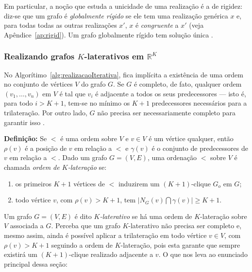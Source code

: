 Em particular, a noção que estuda a unicidade de uma realização é a de rigidez: diz-se que um grafo é \textit{globalmente rígido} se ele tem uma realização genérica $x$ e, para todas todas as outras realizações $x'$, $x$ é \textit{congruente} a $x'$ (veja Apêndice~\ref{ap:rigid}). Um grafo globalmente rígido tem solução única \cite{carlileGDandAplications, rigidezGrafosEAplicacoesAnaCarlile}.

\subsubsection{Realizando grafos $K$-laterativos em $\mathbb{R}^K$ \label{sec:oi}}

No Algorítimo~\ref{alg:realizacaoIterativa}, fica implícita a existência de uma ordem no conjunto de vértices $V$ do grafo $G$. Se $G$ é completo, de fato, qualquer ordem $(v_1,\dots,v_n)$ em $V$ é tal que $v_i$ é adjacente a todos os seus predecessores --- isto é, para todo $i>K+1$, tem-se no mínimo os $K+1$ predecessores necessários para a trilateração. Por outro lado, $G$ não precisa ser necessariamente completo para garantir isso \cite{libertiEDG}.

\begin{center}
	\begin{minipage}{0.93 \linewidth}
		\textbf{Definição:} Se $<$ é uma ordem sobre $V$ e $v\in V$ é um vértice qualquer, então $\rho(v)$ é a posição de $v$ em relação a $<$ e $\gamma(v)$ é o conjunto de predecessores de $v$ em relação a $<$. Dado um grafo $G=(V,E)$, uma ordenação $<$ sobre $V$ é chamada \textit{ordem de $K$-lateração} se:
		\begin{enumerate}
			\vspace{-0.2cm}
			\item os primeiros $K+1$ vértices de $<$ induzirem um $(K+1)$-clique $G_o$ em $G$;
			\vspace{-0.2cm}
			\item todo vértice $v$, com $\rho(v) > K+1$, tem $\lvert N_G(v) \bigcap \gamma(v)\rvert \geq K+1$.
		\end{enumerate}
	\end{minipage}
\end{center}

Um grafo $G = (V,E)$ é dito \textit{$K$-laterativo} se há uma ordem de $K$-lateração sobre $V$ associada a $G$. Perceba que um grafo $K$-laterativo não precisa ser completo e, mesmo assim, ainda é possível aplicar a trilateração em todo vértice $v \in V$, com $\rho(v) >K+1$ seguindo a ordem de $K$-lateração, pois esta garante que sempre existirá um $(K+1)$-clique realizado adjacente a $v$. O que nos leva ao enunciado principal dessa seção:

